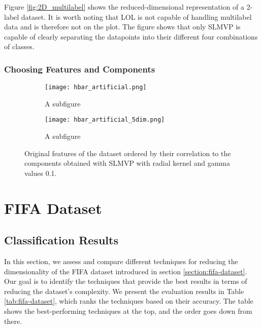 Figure \ref{fig:2D_multilabel} shows the reduced-dimensional representation of a 2-label dataset. It is worth noting that LOL is not capable of handling multilabel data and is therefore not on the plot. The figure shows that only SLMVP is capable of clearly separating the datapoints into their different four combinations of classes.

\subsubsection{Choosing Features and Components}

\begin{figure}[!ht]
    \centering
    \begin{subfigure}{.5\textwidth}
        \centering
        \texttt{[image: hbar\_artificial.png]}
        \caption{A subfigure}
    \end{subfigure}%
    \begin{subfigure}{.5\textwidth}
        \centering
        \texttt{[image: hbar\_artificial\_5dim.png]}
        \caption{A subfigure}
    \end{subfigure}
    \caption{Original features of the dataset ordered by their correlation to the components obtained with SLMVP with radial kernel and gamma values 0.1.}
    \label{fig:test}
\end{figure}


\section{FIFA Dataset}\label{section:fifa}

\subsection{Classification Results}

In this section, we assess and compare different techniques for reducing the dimensionality of the FIFA dataset introduced in section \ref{section:fifa-dataset}. Our goal is to identify the techniques that provide the best results in terms of reducing the dataset's complexity. We present the evaluation results in Table \ref{tab:fifa-dataset}, which ranks the techniques based on their accuracy. The table shows the best-performing techniques at the top, and the order goes down from there.

